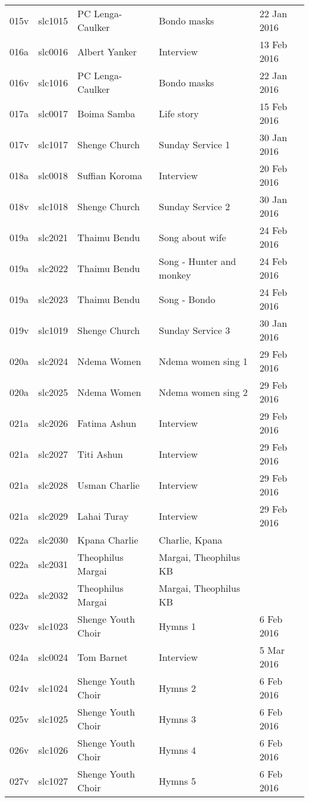 \begin{xltabular}{\textwidth}{lllQl}
015v & slc1015 & PC Lenga-Caulker & Bondo masks & 22 Jan 2016\\
016a & slc0016 & Albert Yanker & Interview & 13 Feb 2016\\
016v & slc1016 & PC Lenga-Caulker & Bondo masks & 22 Jan 2016\\
017a & slc0017 & Boima Samba & Life story & 15 Feb 2016\\
017v & slc1017 & Shenge Church & Sunday Service 1 & 30 Jan 2016\\
018a & slc0018 & Suffian Koroma & Interview & 20 Feb 2016\\
018v & slc1018 & Shenge Church & Sunday Service 2 & 30 Jan 2016\\
019a & slc2021 & Thaimu Bendu & Song about wife & 24 Feb 2016\\
019a & slc2022 & Thaimu Bendu & Song - Hunter and monkey & 24 Feb 2016\\
019a & slc2023 & Thaimu Bendu & Song - Bondo & 24 Feb 2016\\
019v & slc1019 & Shenge Church & Sunday Service 3 & 30 Jan 2016\\
020a & slc2024 & Ndema Women & Ndema women sing 1 & 29 Feb 2016\\
020a & slc2025 & Ndema Women & Ndema women sing 2 & 29 Feb 2016\\
021a & slc2026 & Fatima Ashun & Interview & 29 Feb 2016\\
021a & slc2027 & Titi Ashun & Interview & 29 Feb 2016\\
021a & slc2028 & Usman Charlie & Interview & 29 Feb 2016\\
021a & slc2029 & Lahai Turay & Interview & 29 Feb 2016\\
022a & slc2030 & Kpana Charlie & Charlie, Kpana & \\
022a & slc2031 & Theophilus Margai & Margai, Theophilus KB & \\
022a & slc2032 & Theophilus Margai & Margai, Theophilus KB & \\
023v & slc1023 & Shenge Youth Choir & Hymns 1 & 6 Feb 2016\\
024a & slc0024 & Tom Barnet & Interview & 5 Mar 2016\\
024v & slc1024 & Shenge Youth Choir & Hymns 2 & 6 Feb 2016\\
025v & slc1025 & Shenge Youth Choir & Hymns 3 & 6 Feb 2016\\
026v & slc1026 & Shenge Youth Choir & Hymns 4 & 6 Feb 2016\\
027v & slc1027 & Shenge Youth Choir & Hymns 5 & 6 Feb 2016\\

\end{xltabular}
